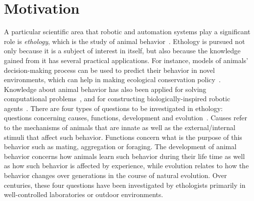 
\section{Motivation}
 
A particular scientific area that robotic and automation systems play a significant role is \textit{ethology}, which is 
the study of animal behavior~\cite{Bolhuis_2004}. Ethology is pursued not only because it is a subject of interest in itself, but also because the knowledge gained from it has several practical applications. For instance, models of animals' decision-making process can be used to predict their behavior in novel environments, which can help in making ecological conservation policy~\cite{Sutherland1998}. Knowledge about animal behavior has also been applied for solving computational problems~\citep{Floreano2008}, and for constructing biologically-inspired robotic agents~\citep{Meyer2008}. There are four types of questions to be investigated in ethology: questions concerning causes, functions, development and evolution~\cite{Bolhuis_2004}. Causes refer to the mechanisms of animals that are innate as well as the external/internal stimuli that affect such behavior. Functions concern what is the purpose of this behavior such as mating, aggregation or foraging. The development of animal behavior concerns how animals learn such behavior during their life time as well as how such behavior is affected by experience, while evolution relates to how the behavior changes over generations in the course of natural evolution. Over centuries, these four questions have been investigated by ethologists primarily in well-controlled laboratories or outdoor environments. 

